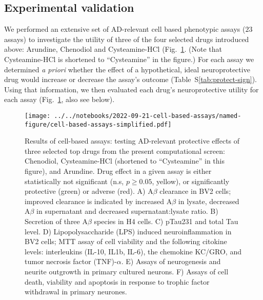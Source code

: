 \documentclass[letterpaper]{article}
\begin{document}
\subsection{Experimental validation}

We performed an extensive set of AD-relevant cell based phenotypic assays
($23$ assays) to investigate the utility of three of the four selected drugs
introduced above: Arundine, Chenodiol and Cysteamine-HCl
(Fig.~\ref{fig:cell-based-assays}.  (Note that Cysteamine-HCl is shortened to
``Cysteamine'' in the figure.)  For each assay we determined \emph{a priori}
whether the effect of a hypothetical, ideal neuroprotective drug would
increase or decrease the assay's outcome (Table~S\ref{tab:protect-sign}).
Using that information, we then evaluated each drug's neuroprotective utility
for each assay (Fig.~\ref{fig:cell-based-assays}, also see below).

\begin{figure}
\texttt{[image: ../../notebooks/2022-09-21-cell-based-assays/named-figure/cell-based-assays-simplified.pdf]}
\caption{Results of cell-based assays: testing AD-relevant protective effects of three
  selected top drugs from the present computational screen: Chenodiol,
  Cysteamine-HCl (shortened to ``Cysteamine'' in this figure), and Arundine.
  Drug effect in a given assay is either statistically not significant (n.s,
  $p \ge 0.05$, yellow), or significantly protective (green) or adverse (red).
  A) A$\beta$ clearance in BV2 cells; improved clearance is indicated by
  increased A$\beta$ in lysate, decreased A$\beta$ in supernatant and
  decreased supernatant:lysate ratio.
  B) Secretion of three A$\beta$ species in H4 cells.
  C) pTau231 and total Tau level.
  D) Lipopolysaccharide (LPS) induced neuroinflammation in BV2 cells; MTT
  assay of cell viability and the following citokine levels: interleukins
  (IL-10, IL1b, IL-6), the chemokine KC/GRO, and tumor necrosis factor
  (TNF)-$\alpha$.
  E) Assays of neurogenesis and neurite outgrowth in primary cultured neurons.
  F) Assays of cell death, viability and apoptosis in response to trophic
  factor withdrawal in primary neurones.
}
\label{fig:cell-based-assays}
\end{figure}
\end{document}
